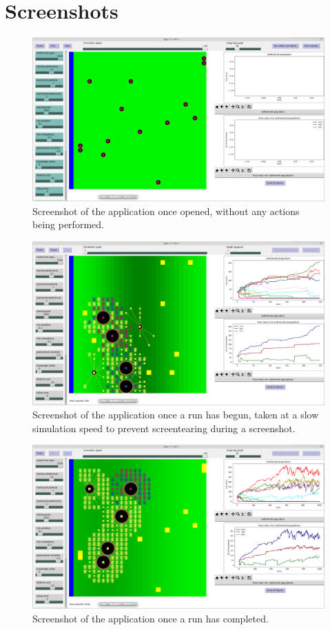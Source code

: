\documentclass[12pt]{article}
\begin{document}
	\section{Screenshots}
	\begin{figure}[!htb]
		\includegraphics[width=15cm]{OnOpen}
		\caption{Screenshot of the application once opened, without any actions being performed.}
		\label{fig:OnOpen}
	\end{figure}
	
	\begin{figure}[!htb]
		\includegraphics[width=15cm]{WhileRunning}
		\caption{Screenshot of the application once a run has begun, taken at a slow simulation speed to prevent screentearing during a screenshot.}
		\label{fig:WhileRunning}
	\end{figure}
	
	\begin{figure}[!htb]
		\includegraphics[width=15cm]{FinishedRunning}
		\caption{Screenshot of the application once a run has completed.}
		\label{fig:FinishedRunning}
	\end{figure}
	
\end{document}
